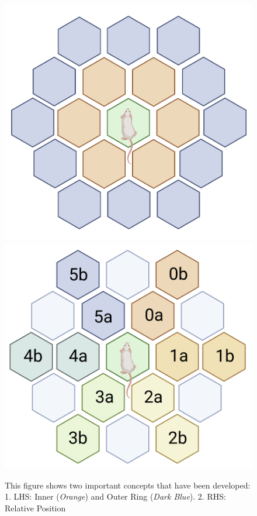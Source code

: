 \begin{figure}[H]
    \centering
    \includegraphics[scale = 0.5 ]{images/outer_rings.png}
    \includegraphics[scale = 0.50]{images/relative_position_mapped.png}
    \caption{This figure shows two important concepts that have been developed: 1. LHS: Inner (\textit{Orange}) and Outer Ring (\textit{Dark Blue}). 2. RHS: Relative Position}
    \label{fig:inner_ring}
\end{figure}



